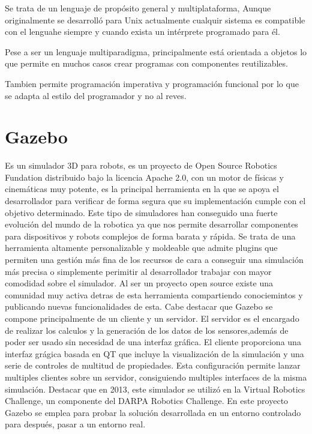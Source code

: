 Se trata de un lenguaje de propósito general y multiplataforma, Aunque originalmente se desarrolló para Unix actualmente cualquir sistema es compatible con el lenguahe siempre y cuando exista un intérprete programado para él.

Pese a ser un lenguaje multiparadigma, principalmente está orientada a objetos lo que permite en muchos casos crear programas con componentes reutilizables. 

Tambien permite programación imperativa y programación funcional por lo que se adapta al estilo del programador y no al reves.

\section{Gazebo}
\label{sec:gazebo}
Es un simulador 3D para robots, es un proyecto de Open Source Robotics Fundation distribuido bajo la licencia Apache 2.0, con un motor de físicas y cinemáticas muy potente, es la principal herramienta en la que se apoya el desarrollador para verificar de forma segura que su implementación cumple con el objetivo determinado. Este tipo de simuladores han conseguido una fuerte evolución del mundo de la robotica ya que nos permite desarrollar componentes para dispositivos y robots complejos de forma barata y rápida.
Se trata de una herramienta altamente personalizable y moldeable que admite plugins que permiten una gestión más fina de los recursos de cara a conseguir una simulación más precisa o simplemente perimitir al desarrollador trabajar con mayor comodidad sobre el simulador.
Al ser un proyecto open source existe una comunidad muy activa detras de esta herramienta compartiendo conociemintos y publicando nuevas funcionalidades de esta.
Cabe destacar que Gazebo se compone principalmente de un cliente y un servidor. El
servidor es el encargado de realizar los calculos y la generación de los datos de los sensores,además de poder ser usado sin necesidad de una interfaz gráfica.
El cliente proporciona una interfaz grágica basada en QT que incluye la visualización de la simulación y una serie de controles de multitud de propiedades. Esta configuración permite lanzar multiples clientes sobre un servidor, consiguiendo multiples interfaces de la misma simulación.
Destacar que en 2013, este simulador se utilizó en la Virtual Robotics Challenge, un componente del DARPA Robotics Challenge.
En este proyecto Gazebo se emplea para probar la solución desarrollada en un entorno controlado para después, pasar a un entorno real.
